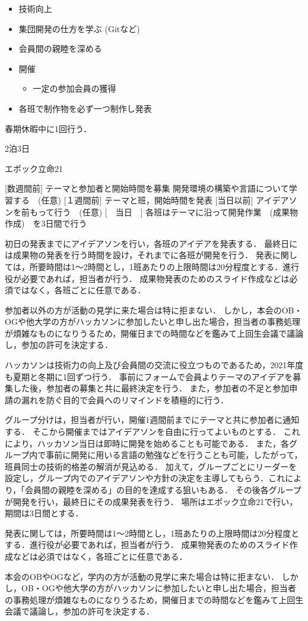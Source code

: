 \begin{itemize}
    \item 技術向上
    \item 集団開発の仕方を学ぶ (Gitなど)
    \item 会員間の親睦を深める
    \item 開催
    \begin{itemize}
        \item 一定の参加会員の獲得
    \end{itemize}
    \item 各班で制作物を必ず一つ制作し発表
\end{itemize}


春期休暇中に1回行う．

2泊3日

エポック立命21

[数週間前]	テーマと参加者と開始時間を募集
           開発環境の構築や言語について学習する　(任意)
[１週間前]	テーマと班，開始時間を発表
[当日以前]	アイデアソンを前もって行う　(任意)
[　当日　]	各班はテーマに沿って開発作業　(成果物作成)　を3日間で行う

初日の発表までにアイデアソンを行い，各班のアイデアを発表する．
最終日には成果物の発表を行う時間を設け，それまでに各班が開発を行う．
発表に関しては，所要時間は1～2時間とし，1班あたりの上限時間は20分程度とする．進行役が必要であれば，担当者が行う．
成果物発表のためのスライド作成などは必須ではなく，各班ごとに任意である．


参加者以外の方が活動の見学に来た場合は特に拒まない．
しかし，本会のOB・OGや他大学の方がハッカソンに参加したいと申し出た場合，担当者の事務処理が煩雑なものになりうるため，開催日までの時間などを鑑みて上回生会議で議論し，参加の許可を決定する．


ハッカソンは技術力の向上及び会員間の交流に役立つものであるため，2021年度も夏期と冬期に1回ずつ行う．
事前にフォームで会員よりテーマのアイデアを募集した後，参加者の募集と共に最終決定を行う．
また，参加者の不足と参加申請の漏れを防ぐ目的で会員へのリマインドを積極的に行う．


グループ分けは，担当者が行い，開催1週間前までにテーマと共に参加者に通知する．
そこから開催まではアイデアソンを自由に行ってよいものとする．
これにより，ハッカソン当日は即時に開発を始めることも可能である．
また，各グループ内で事前に開発に用いる言語の勉強などを行うことも可能，したがって，班員同士の技術的格差の解消が見込める．
加えて，グループごとにリーダーを設定し，グループ内でのアイデアソンや方針の決定を主導してもらう．これにより，「会員間の親睦を深める」の目的を達成する狙いもある．
その後各グループが開発を行い，最終日にその成果発表を行う．
場所はエポック立命21で行い，期間は3日間とする．

発表に関しては，所要時間は1～2時間とし，1班あたりの上限時間は20分程度とする．進行役が必要であれば，担当者が行う．
成果物発表のためのスライド作成などは必須ではなく，各班ごとに任意である．

本会のOBやOGなど，学内の方が活動の見学に来た場合は特に拒まない．
しかし，OB・OGや他大学の方がハッカソンに参加したいと申し出た場合，担当者の事務処理が煩雑なものになりうるため，開催日までの時間などを鑑みて上回生会議で議論し，参加の許可を決定する．

